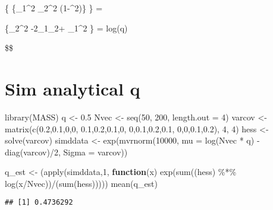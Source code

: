 \documentclass[
]{article}
\newenvironment{Shaded}{\begin{snugshade}}{\end{snugshade}}
\newcommand{\AttributeTok}[1]{\textcolor[rgb]{0.77,0.63,0.00}{#1}}
\newcommand{\ControlFlowTok}[1]{\textcolor[rgb]{0.13,0.29,0.53}{\textbf{#1}}}
\newcommand{\DecValTok}[1]{\textcolor[rgb]{0.00,0.00,0.81}{#1}}
\newcommand{\FloatTok}[1]{\textcolor[rgb]{0.00,0.00,0.81}{#1}}
\newcommand{\FunctionTok}[1]{\textcolor[rgb]{0.00,0.00,0.00}{#1}}
\newcommand{\NormalTok}[1]{#1}
\newcommand{\OtherTok}[1]{\textcolor[rgb]{0.56,0.35,0.01}{#1}}
\newcommand{\SpecialCharTok}[1]{\textcolor[rgb]{0.00,0.00,0.00}{#1}}
\begin{document}
\{ \{\sigma\_1\^{}2 \sigma\_2\^{}2
(1-\rho\^{}2)\} \} = 

\{\sigma\_2\^{}2 -2\rho\sigma\_1\sigma\_2+ \sigma\_1\^{}2 \} = log(q)

\$\$

\hypertarget{sim-analytical-q}{%
\section{Sim analytical q}\label{sim-analytical-q}}

\begin{Shaded}
\begin{Highlighting}[]
\FunctionTok{library}\NormalTok{(MASS)}
\NormalTok{q }\OtherTok{\textless{}{-}} \FloatTok{0.5}
\NormalTok{Nvec }\OtherTok{\textless{}{-}} \FunctionTok{seq}\NormalTok{(}\DecValTok{50}\NormalTok{, }\DecValTok{200}\NormalTok{, }\AttributeTok{length.out =} \DecValTok{4}\NormalTok{)}
\NormalTok{varcov }\OtherTok{\textless{}{-}} \FunctionTok{matrix}\NormalTok{(}\FunctionTok{c}\NormalTok{(}\FloatTok{0.2}\NormalTok{,}\FloatTok{0.1}\NormalTok{,}\DecValTok{0}\NormalTok{,}\DecValTok{0}\NormalTok{,}
                   \FloatTok{0.1}\NormalTok{,}\FloatTok{0.2}\NormalTok{,}\FloatTok{0.1}\NormalTok{,}\DecValTok{0}\NormalTok{,}
                   \DecValTok{0}\NormalTok{,}\FloatTok{0.1}\NormalTok{,}\FloatTok{0.2}\NormalTok{,}\FloatTok{0.1}\NormalTok{,}
                   \DecValTok{0}\NormalTok{,}\DecValTok{0}\NormalTok{,}\FloatTok{0.1}\NormalTok{,}\FloatTok{0.2}\NormalTok{), }\DecValTok{4}\NormalTok{, }\DecValTok{4}\NormalTok{)}
\NormalTok{hess }\OtherTok{\textless{}{-}} \FunctionTok{solve}\NormalTok{(varcov)}
\NormalTok{simddata }\OtherTok{\textless{}{-}} \FunctionTok{exp}\NormalTok{(}\FunctionTok{mvrnorm}\NormalTok{(}\DecValTok{10000}\NormalTok{, }\AttributeTok{mu =} \FunctionTok{log}\NormalTok{(Nvec }\SpecialCharTok{*}\NormalTok{ q) }\SpecialCharTok{{-}} \FunctionTok{diag}\NormalTok{(varcov)}\SpecialCharTok{/}\DecValTok{2}\NormalTok{, }\AttributeTok{Sigma =}\NormalTok{ varcov))}

\NormalTok{q\_est }\OtherTok{\textless{}{-}}\NormalTok{ (}\FunctionTok{apply}\NormalTok{(simddata,}\DecValTok{1}\NormalTok{, }\ControlFlowTok{function}\NormalTok{(x) }\FunctionTok{exp}\NormalTok{(}\FunctionTok{sum}\NormalTok{((hess) }\SpecialCharTok{\%*\%} \FunctionTok{log}\NormalTok{(x}\SpecialCharTok{/}\NormalTok{Nvec))}\SpecialCharTok{/}\NormalTok{(}\FunctionTok{sum}\NormalTok{(hess)))))}
\FunctionTok{mean}\NormalTok{(q\_est)}
\end{Highlighting}
\end{Shaded}

\begin{verbatim}
## [1] 0.4736292
\end{verbatim}
\end{document}
